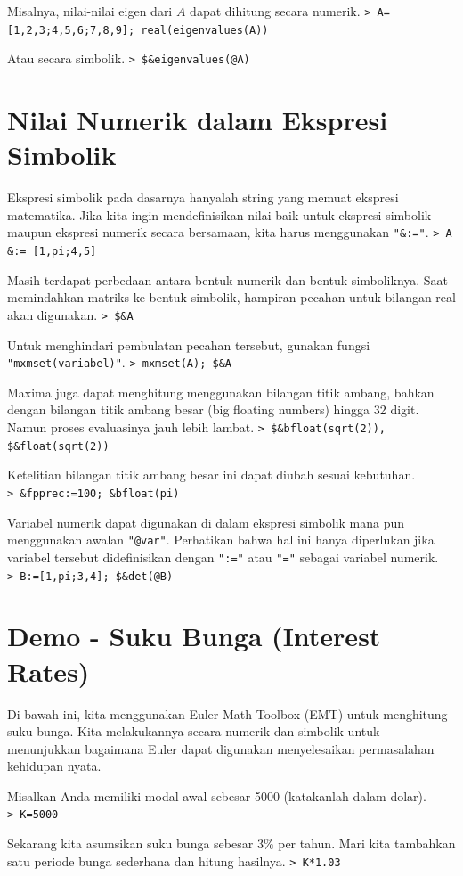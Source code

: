 \documentclass[11pt, a4paper]{article}
\newcommand{\emtcmd}[1]{\noindent\texttt{\textcolor{emtcommand}{>}\ #1}\par\smallskip}
\begin{document}
Misalnya, nilai-nilai eigen dari $A$ dapat dihitung secara numerik.
\emtcmd{A=[1,2,3;4,5,6;7,8,9]; real(eigenvalues(A))}

Atau secara simbolik.
\emtcmd{\$\&eigenvalues(@A)}

\section*{Nilai Numerik dalam Ekspresi Simbolik}

Ekspresi simbolik pada dasarnya hanyalah string yang memuat ekspresi matematika. Jika kita ingin mendefinisikan nilai baik untuk ekspresi simbolik maupun ekspresi numerik secara bersamaan, kita harus menggunakan \texttt{"\&:="}.
\emtcmd{A \&:= [1,pi;4,5]}

Masih terdapat perbedaan antara bentuk numerik dan bentuk simboliknya. Saat memindahkan matriks ke bentuk simbolik, hampiran pecahan untuk bilangan real akan digunakan.
\emtcmd{\$\&A}

Untuk menghindari pembulatan pecahan tersebut, gunakan fungsi \texttt{"mxmset(variabel)"}.
\emtcmd{mxmset(A); \$\&A}

Maxima juga dapat menghitung menggunakan bilangan titik ambang, bahkan dengan bilangan titik ambang besar (big floating numbers) hingga 32 digit. Namun proses evaluasinya jauh lebih lambat.
\emtcmd{\$\&bfloat(sqrt(2)), \$\&float(sqrt(2))}

Ketelitian bilangan titik ambang besar ini dapat diubah sesuai kebutuhan.
\emtcmd{\&fpprec:=100; \&bfloat(pi)}

Variabel numerik dapat digunakan di dalam ekspresi simbolik mana pun menggunakan awalan \texttt{"@var"}. Perhatikan bahwa hal ini hanya diperlukan jika variabel tersebut didefinisikan dengan \texttt{":="} atau \texttt{"="} sebagai variabel numerik.
\emtcmd{B:=[1,pi;3,4]; \$\&det(@B)}

\section*{Demo - Suku Bunga (Interest Rates)}

Di bawah ini, kita menggunakan Euler Math Toolbox (EMT) untuk menghitung suku bunga. Kita melakukannya secara numerik dan simbolik untuk menunjukkan bagaimana Euler dapat digunakan menyelesaikan permasalahan kehidupan nyata.

Misalkan Anda memiliki modal awal sebesar 5000 (katakanlah dalam dolar).
\emtcmd{K=5000}

Sekarang kita asumsikan suku bunga sebesar $3\%$ per tahun. Mari kita tambahkan satu periode bunga sederhana dan hitung hasilnya.
\emtcmd{K*1.03}
\end{document}
